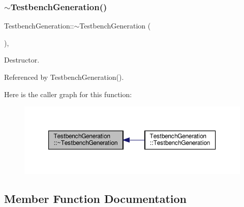 \subsubsection{\texorpdfstring{$\sim$\+Testbench\+Generation()}{~TestbenchGeneration()}}
{\footnotesize\ttfamily Testbench\+Generation\+::$\sim$\+Testbench\+Generation (\begin{DoxyParamCaption}{ }\end{DoxyParamCaption})\hspace{0.3cm}{\ttfamily [override]}, {\ttfamily [default]}}



Destructor. 



Referenced by Testbench\+Generation().

Here is the caller graph for this function\+:
\nopagebreak
\begin{figure}[H]
\begin{center}
\leavevmode
\includegraphics[width=350pt]{d9/dfd/classTestbenchGeneration_a4238f9a5c5f3b4cabad4b1a3ce50b97c_icgraph}
\end{center}
\end{figure}


\subsection{Member Function Documentation}
\mbox{\label{classTestbenchGeneration_a6b4deb36d975f415b00b8ae464f4a17c}} 
